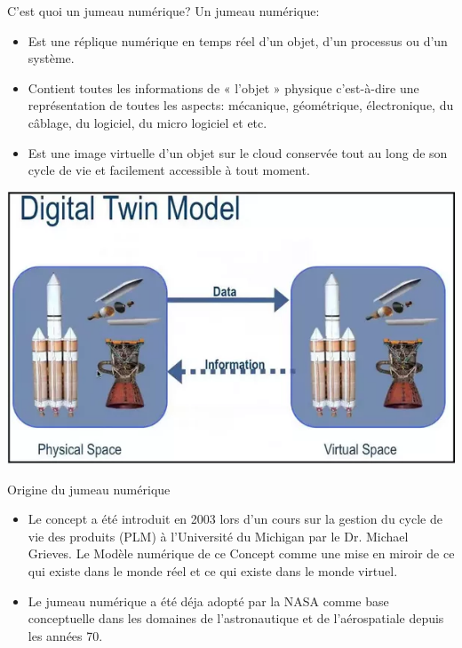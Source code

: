 \documentclass{beamer}
\begin{document}
\begin{frame}{C'est quoi un jumeau numérique?}
Un jumeau numérique:
\begin{itemize}
  \item Est une réplique numérique en temps réel d'un objet, d'un processus ou d'un système.
  \item Contient toutes les informations de « l’objet » physique c’est-à-dire une représentation de toutes les aspects: mécanique, géométrique, électronique, du câblage, du logiciel, du micro logiciel et etc.
  \item Est une image virtuelle d'un objet sur le cloud conservée tout au long de son cycle de vie et facilement 
  accessible à tout moment.
\end{itemize}

\includegraphics[scale=0.3]{images/digital_twin_auth.png} 
\vskip 1cm
%

\end{frame}
\begin{frame}{Origine du jumeau numérique}
  \begin{itemize}
    \item Le concept a été introduit en 2003 lors d’un cours sur la gestion du cycle de vie des produits (PLM) à l'Université du Michigan par le Dr. Michael Grieves. Le Modèle numérique de ce Concept comme une mise en miroir de ce qui existe dans le monde réel et ce qui existe dans le monde virtuel.
    \item Le jumeau numérique a été déja adopté par la NASA comme base conceptuelle dans les domaines de l'astronautique et de l'aérospatiale depuis les années 70.
  \end{itemize}
\end{frame}
\end{document}
